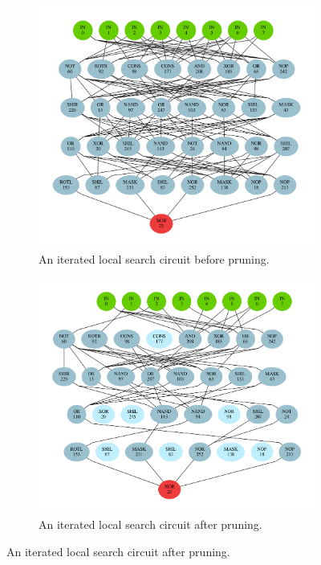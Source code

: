 \documentclass[
  print, %
  Table,   %
  nolof,     %
  nolot,     %
  11pt, %
  oneside  %
]{fithesis3}
\begin{document}
\begin{figure}
\begin{changemargin}{-3cm}{-3cm}
\centering
\begin{subfigure}{.65\textwidth}
  \centering
  \includegraphics[width=\textwidth]{./graphics/ils/circuit}
  \caption{An iterated local search circuit before pruning.}
  \label{fig:ils-circuit-unpruned}
\end{subfigure}%
\begin{subfigure}{.65\textwidth}
  \centering
  \includegraphics[width=\textwidth]{./graphics/ils/pruned}
  \caption{An iterated local search circuit after pruning.}
  \label{fig:ils-circuit-pruned}
\end{subfigure}


\end{changemargin}
\end{figure}
\end{document}
